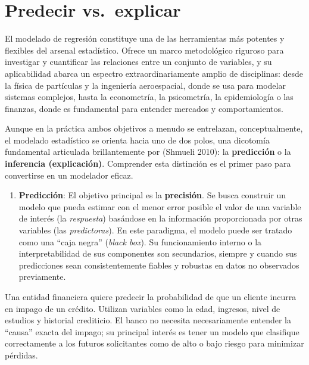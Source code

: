 \documentclass[
  letterpaper,
  DIV=11,
  numbers=noendperiod]{scrreprt}
\providecommand{\tightlist}{%
  \setlength{\itemsep}{0pt}\setlength{\parskip}{0pt}}
\begin{document}
\section{Predecir vs.~explicar}\label{sec-proposito}

El modelado de regresión constituye una de las herramientas más potentes
y flexibles del arsenal estadístico. Ofrece un marco metodológico
riguroso para investigar y cuantificar las relaciones entre un conjunto
de variables, y su aplicabilidad abarca un espectro extraordinariamente
amplio de disciplinas: desde la física de partículas y la ingeniería
aeroespacial, donde se usa para modelar sistemas complejos, hasta la
econometría, la psicometría, la epidemiología o las finanzas, donde es
fundamental para entender mercados y comportamientos.

Aunque en la práctica ambos objetivos a menudo se entrelazan,
conceptualmente, el modelado estadístico se orienta hacia uno de dos
polos, una dicotomía fundamental articulada brillantemente por (Shmueli
2010): la \textbf{predicción} o la \textbf{inferencia (explicación)}.
Comprender esta distinción es el primer paso para convertirse en un
modelador eficaz.

\begin{enumerate}
\def\labelenumi{\arabic{enumi}.}
\tightlist
\item
  \textbf{Predicción}: El objetivo principal es la \textbf{precisión}.
  Se busca construir un modelo que pueda estimar con el menor error
  posible el valor de una variable de interés (la \emph{respuesta})
  basándose en la información proporcionada por otras variables (las
  \emph{predictoras}). En este paradigma, el modelo puede ser tratado
  como una ``caja negra'' (\emph{black box}). Su funcionamiento interno
  o la interpretabilidad de sus componentes son secundarios, siempre y
  cuando sus predicciones sean consistentemente fiables y robustas en
  datos no observados previamente.
\end{enumerate}

\begin{tcolorbox}[enhanced jigsaw, breakable, toprule=.15mm, bottomtitle=1mm, coltitle=black, colbacktitle=quarto-callout-tip-color!10!white, titlerule=0mm, opacitybacktitle=0.6, bottomrule=.15mm, toptitle=1mm, title=\textcolor{quarto-callout-tip-color}{\faLightbulb}\hspace{0.5em}{Ejemplo}, arc=.35mm, rightrule=.15mm, opacityback=0, colframe=quarto-callout-tip-color-frame, leftrule=.75mm, left=2mm, colback=white]

Una entidad financiera quiere predecir la probabilidad de que un cliente
incurra en impago de un crédito. Utilizan variables como la edad,
ingresos, nivel de estudios y historial crediticio. El banco no necesita
necesariamente entender la ``causa'' exacta del impago; su principal
interés es tener un modelo que clasifique correctamente a los futuros
solicitantes como de alto o bajo riesgo para minimizar pérdidas.

\end{tcolorbox}
\end{document}
